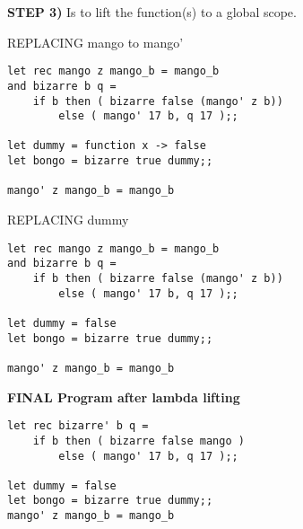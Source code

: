 \noindent \textbf{STEP 3)} Is to lift the function(s) to a global scope.

REPLACING mango to mango'
\begin{verbatim}
let rec mango z mango_b = mango_b
and bizarre b q =
    if b then ( bizarre false (mango' z b))
        else ( mango' 17 b, q 17 );;

let dummy = function x -> false
let bongo = bizarre true dummy;;

mango' z mango_b = mango_b
\end{verbatim}


REPLACING dummy 
\begin{verbatim}
let rec mango z mango_b = mango_b
and bizarre b q =
    if b then ( bizarre false (mango' z b))
        else ( mango' 17 b, q 17 );;

let dummy = false
let bongo = bizarre true dummy;;

mango' z mango_b = mango_b
\end{verbatim}

\newpage
\noindent \textbf{FINAL Program after lambda lifting}
\begin{verbatim}
let rec bizarre' b q =
    if b then ( bizarre false mango )
        else ( mango' 17 b, q 17 );;

let dummy = false
let bongo = bizarre true dummy;;
mango' z mango_b = mango_b
\end{verbatim}

\newpage